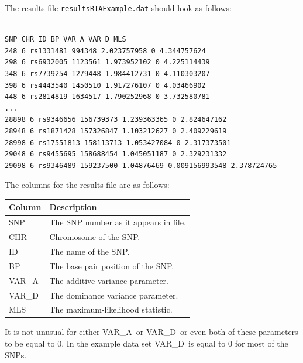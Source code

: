 \documentclass[a4paper,12pt]{article}
\newcommand{\code}[1]{{\footnotesize{{\tt #1}}}}
\begin{document}
The results file \code{resultsRIAExample.dat} should look as follows: 
\vspace{0.35cm} \begin{lstlisting}

SNP CHR ID BP VAR_A VAR_D MLS
248 6 rs1331481 994348 2.023757958 0 4.344757624
298 6 rs6932005 1123561 1.973952102 0 4.225114439
348 6 rs7739254 1279448 1.984412731 0 4.110303207
398 6 rs4443540 1450510 1.917276107 0 4.03466902
448 6 rs2814819 1634517 1.790252968 0 3.732580781
...
28898 6 rs9346656 156739373 1.239363365 0 2.824647162
28948 6 rs1871428 157326847 1.103212627 0 2.409229619
28998 6 rs17551813 158113713 1.053427084 0 2.317373501
29048 6 rs9455695 158688454 1.045051187 0 2.329231332
29098 6 rs9346489 159237500 1.04876469 0.009156993548 2.378724765

\end{lstlisting} \vspace{0.35cm}
The columns for the results file are as follows: 

{\begin{center}\begin{tabular}{ll}
Column  & Description\\
\hline
SNP  & The SNP number as it appears in file.\\
CHR  & Chromosome of the SNP.\\
ID  & The name of the SNP.\\
BP  & The base pair position of the SNP.\\
VAR\_A & The additive variance parameter.\\
VAR\_D & The dominance variance parameter.\\
MLS  & The maximum-likelihood statistic.\\
\end{tabular}\end{center}}

It is not unusual for either VAR\_A~or VAR\_D~or even both of these parameters to be equal to 0. In the example data set VAR\_D~is equal to 0 for most of the SNPs. 
\end{document}

